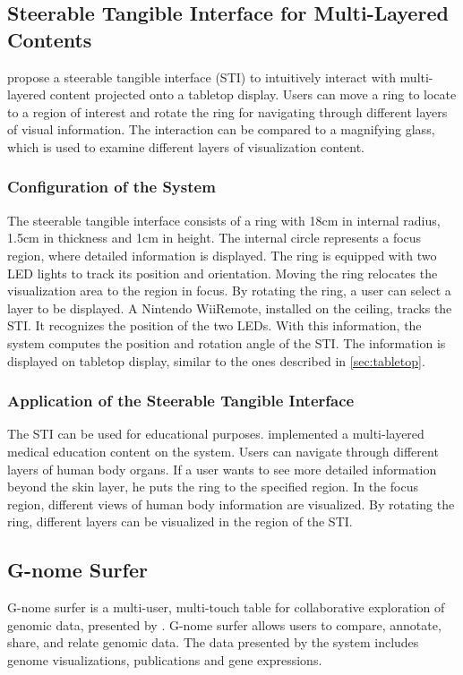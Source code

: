 \subsection{Steerable Tangible Interface for Multi-Layered Contents}
\cite{lee09} propose a steerable tangible interface (STI) to intuitively interact with multi-layered content projected onto a tabletop display. Users can move a ring to locate to a region of interest and rotate the ring for navigating through different layers of visual information. The interaction can be compared to a magnifying glass, which is used to examine different layers of visualization content. 

\subsubsection{Configuration of the System}
The steerable tangible interface consists of a ring with 18cm in internal radius, 1.5cm in thickness and 1cm in height. The internal circle represents a focus region, where detailed information is displayed. The ring is equipped with two LED lights to track its position and orientation. Moving the ring relocates the visualization area to the region in focus. By rotating the ring, a user can select a layer to be displayed. A Nintendo WiiRemote, installed on the ceiling,  tracks the STI. It recognizes the position of the two LEDs. With this information, the system computes the position and rotation angle of the STI. The information is displayed on tabletop display, similar to the ones described in \ref{sec:tabletop}. 

\subsubsection{Application of the Steerable Tangible Interface}
The STI can be used for educational purposes. \cite{lee09} implemented a multi-layered medical education content on the system. Users can navigate through different layers of human body organs. If a user wants to see more detailed information beyond the skin layer, he puts the ring to the specified region. In the focus region, different views of human body information are visualized. By rotating the ring, different layers can be visualized in the region of the STI.  

\subsection{G-nome Surfer}
G-nome surfer is a multi-user, multi-touch table for collaborative exploration of genomic data, presented by \cite{shaer10}. G-nome surfer allows users to compare, annotate, share, and relate genomic data. The data presented by the system includes genome visualizations, publications and gene expressions.


